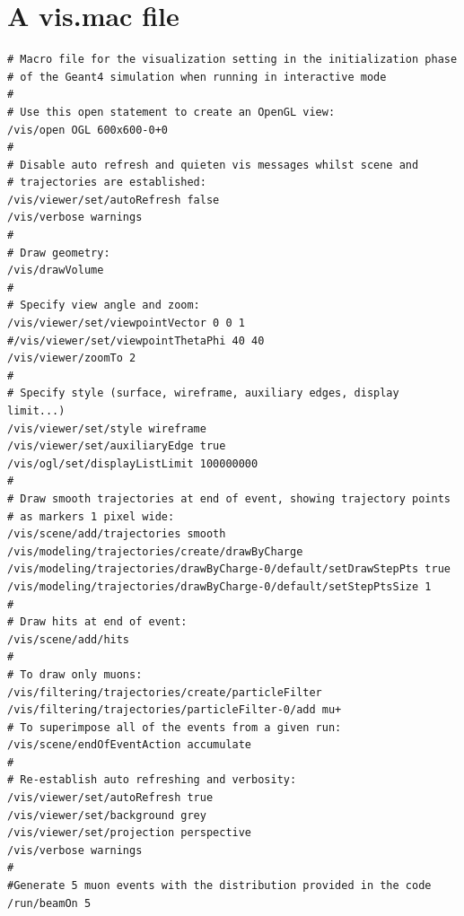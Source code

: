 \section{A vis.mac file}
\label{ch:annex:sec:vis.mac}

\begin{verbatim}
# Macro file for the visualization setting in the initialization phase 
# of the Geant4 simulation when running in interactive mode
#
# Use this open statement to create an OpenGL view:
/vis/open OGL 600x600-0+0
#
# Disable auto refresh and quieten vis messages whilst scene and
# trajectories are established:
/vis/viewer/set/autoRefresh false
/vis/verbose warnings
#
# Draw geometry:
/vis/drawVolume
#
# Specify view angle and zoom:
/vis/viewer/set/viewpointVector 0 0 1
#/vis/viewer/set/viewpointThetaPhi 40 40
/vis/viewer/zoomTo 2
#
# Specify style (surface, wireframe, auxiliary edges, display limit...)
/vis/viewer/set/style wireframe
/vis/viewer/set/auxiliaryEdge true
/vis/ogl/set/displayListLimit 100000000
#
# Draw smooth trajectories at end of event, showing trajectory points
# as markers 1 pixel wide:
/vis/scene/add/trajectories smooth
/vis/modeling/trajectories/create/drawByCharge
/vis/modeling/trajectories/drawByCharge-0/default/setDrawStepPts true
/vis/modeling/trajectories/drawByCharge-0/default/setStepPtsSize 1
#
# Draw hits at end of event:
/vis/scene/add/hits
#
# To draw only muons:
/vis/filtering/trajectories/create/particleFilter
/vis/filtering/trajectories/particleFilter-0/add mu+
# To superimpose all of the events from a given run:
/vis/scene/endOfEventAction accumulate
#
# Re-establish auto refreshing and verbosity:
/vis/viewer/set/autoRefresh true
/vis/viewer/set/background grey
/vis/viewer/set/projection perspective
/vis/verbose warnings
#
#Generate 5 muon events with the distribution provided in the code
/run/beamOn 5

\end{verbatim}


